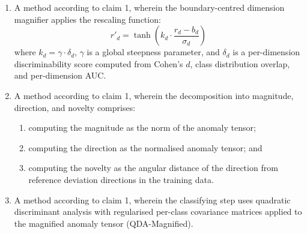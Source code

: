 \documentclass[12pt,a4paper]{article}
\begin{document}
\begin{enumerate}[label=\textbf{\arabic*.}]
\begin{enumerate}[label=(\alph*)]
\item a tensor construction module configured to assemble the deviation 
measurements into a multi-dimensional anomaly tensor;

\item a decomposition module configured to decompose the anomaly tensor 
into magnitude, direction, and novelty components;

\item a magnifier module configured to rescale each dimension of the 
anomaly tensor using a boundary-centred rescaling function with 
per-dimension steepness computed from empirical class separability; and

\item a classifier module configured to produce an anomaly score and 
per-law-domain attribution from the magnified tensor;
\end{enumerate}
wherein the plurality of spectrum operators collectively satisfy a 
deviation-separating condition such that the stacked Jacobian matrix of the 
operators has full column rank.

\item A method according to claim 1, wherein the boundary-centred dimension 
magnifier applies the rescaling function:
\[
r'_d = \tanh\left(k_d \cdot \frac{r_d - b_d}{\sigma_d}\right)
\]
where $k_d = \gamma \cdot \delta_d$, $\gamma$ is a global steepness 
parameter, and $\delta_d$ is a per-dimension discriminability score computed 
from Cohen's $d$, class distribution overlap, and per-dimension AUC.

\item A method according to claim 1, wherein the decomposition into 
magnitude, direction, and novelty comprises:
\begin{enumerate}[label=(\alph*)]
\item computing the magnitude as the norm of the anomaly tensor;
\item computing the direction as the normalised anomaly tensor; and
\item computing the novelty as the angular distance of the direction from 
reference deviation directions in the training data.
\end{enumerate}

\item A method according to claim 1, wherein the classifying step uses 
quadratic discriminant analysis with regularised per-class covariance 
matrices applied to the magnified anomaly tensor (QDA-Magnified).


\end{enumerate}
\end{document}
